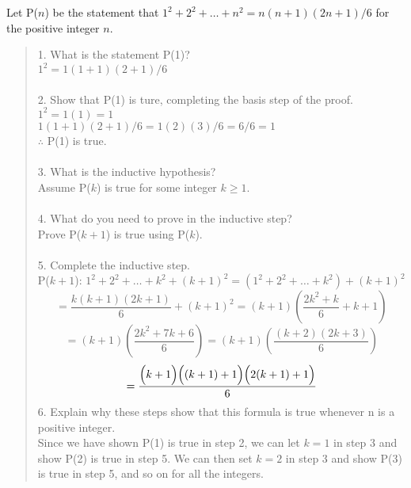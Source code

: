 \documentclass[12pt]{article}
\newenvironment{problem}[2][Problem]{\begin{trivlist}
\item[\hskip \labelsep {\bfseries #1}\hskip \labelsep {\bfseries #2.}]}{\end{trivlist}}
\begin{document}
\pagebreak
\begin{problem}{2}
    Let P($n$) be the statement that $1^2 + 2^2 + \ldots + n^2 = n(n + 1)(2n + 1)/6$ for the positive integer $n$.
    \begin{quote}
        1. What is the statement P(1)?\\
        $1^2 = 1(1+1)(2+1)/6$\\\\
        2. Show that P(1) is ture, completing the basis step of the proof.\\
        $1^2 = 1(1) = 1$\\ 
        $1(1+1)(2+1)/6 = 1(2)(3)/6 = 6/6 = 1$\\
        $\therefore$ P(1) is true.\\\\
        3. What is the inductive hypothesis?\\
        Assume P($k$) is true for some integer $k \geq 1$.\\\\
        4. What do you need to prove in the inductive step?\\
        Prove P($k+1$) is true using P($k$).\\\\
        5. Complete the inductive step.\\
        P($k+1$): $1^2 + 2^2 + \ldots + k^2 + (k+1)^2 = (1^2 + 2^2 + \ldots + k^2) + (k+1)^2$\\
        $$=\frac{k(k+1)(2k+1)}{6}+(k+1)^2 = (k+1)\left(\frac{2k^2+k}{6}+k+1\right)$$
        $$=(k+1)\left(\frac{2k^2+7k+6}{6}\right) = (k+1)\left(\frac{(k+2)(2k+3)}{6}\right)$$
        $$=\frac{\Bigl(k+1\Bigr)\Bigl((k+1)+1\Bigr)\Bigl(2(k+1)+1\Bigr)}{6}$$
        6. Explain why these steps show that this formula is true whenever n is a positive integer.\\
        Since we have shown P(1) is true in step 2, we can let $k=1$ in step 3 and show P(2) is true in step 5.
        We can then set $k=2$ in step 3 and show P(3) is true in step 5, and so on for all the integers. 
    \end{quote}
\end{problem}
\pagebreak
\end{document}
